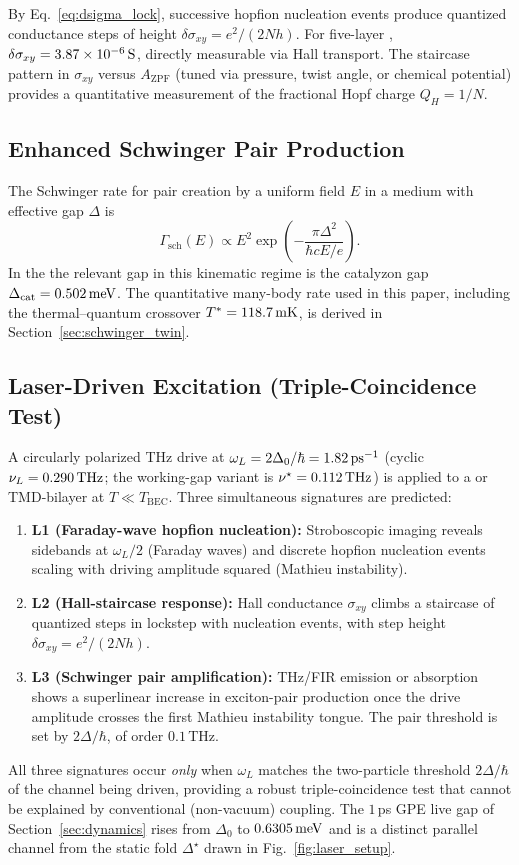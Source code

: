 \documentclass[11pt,letterpaper]{article}
\begin{document}
By Eq.~\eqref{eq:dsigma_lock}, successive hopfion nucleation events produce quantized conductance steps of height $\delta \sigma_{xy} = e^2/(2Nh)$. For five-layer \MATBG{}, $\delta \sigma_{xy} =3.87\times 10^{-6}\,\mathrm{S}$, directly measurable via Hall transport. The staircase pattern in $\sigma_{xy}$ versus $A_{\text{ZPF}}$ (tuned via pressure, twist angle, or chemical potential) provides a quantitative measurement of the fractional Hopf charge $Q_H = 1/N$.

\subsection{Enhanced Schwinger Pair Production}

The Schwinger rate for pair creation by a uniform field $E$ in a medium with effective gap $\Delta$ is\cite{Heisenberg1936,Schwinger1951,Dunne2009}
\begin{equation}
\Gamma_{\text{sch}}(E) \propto E^2 \exp\left( -\frac{\pi \Delta^2}{\hbar c E / e} \right).
\end{equation}
In the \TEVC{} the relevant gap in this kinematic regime is the catalyzon gap $\Delta_{\text{cat}}=0.502\,\mathrm{meV}$. The quantitative many-body rate used in this paper, including the thermal--quantum crossover $T^*=118.7\,\mathrm{mK}$, is derived in Section~\ref{sec:schwinger_twin}.

\subsection{Laser-Driven \QVC{} Excitation (Triple-Coincidence Test)}

A circularly polarized THz drive at $\omega_L = 2\Delta_0/\hbar=1.82\,\mathrm{ps}^{-1}$ (cyclic $\nu_L=0.290\,\mathrm{THz}$; the working-gap variant is $\nu^\star=0.112\,\mathrm{THz}$) is applied to a \MATBG{} or TMD-bilayer \TEVC{} at $T \ll T_{\text{BEC}}$. Three simultaneous signatures are predicted:
\begin{enumerate}
    \item \textbf{L1 (Faraday-wave hopfion nucleation):} Stroboscopic imaging reveals sidebands at $\omega_L/2$ (Faraday waves) and discrete hopfion nucleation events scaling with driving amplitude squared (Mathieu instability)\cite{Engels2007,Vudragovic2019}.
    \item \textbf{L2 (Hall-staircase response):} Hall conductance $\sigma_{xy}$ climbs a staircase of quantized steps in lockstep with nucleation events, with step height $\delta \sigma_{xy} = e^2/(2Nh)$.
    \item \textbf{L3 (Schwinger pair amplification):} THz/FIR emission or absorption shows a superlinear increase in exciton-pair production once the drive amplitude crosses the first Mathieu instability tongue. The pair threshold is set by $2\Delta/\hbar$, of order $0.1$\,THz.
\end{enumerate}
All three signatures occur \textit{only} when $\omega_L$ matches the two-particle threshold $2\Delta/\hbar$ of the channel being driven, providing a robust triple-coincidence test that cannot be explained by conventional (non-vacuum) coupling. The $1$\,ps GPE live gap of Section~\ref{sec:dynamics} rises from $\Delta_0$ to $0.6305\,\mathrm{meV}$ and is a distinct parallel channel from the static fold $\Delta^\star$ drawn in Fig.~\ref{fig:laser_setup}.
\end{document}
